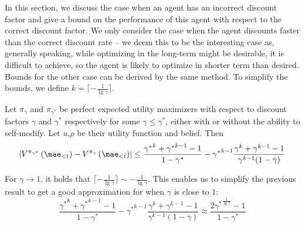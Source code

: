 In this section, we discuss the case when an agent has an incorrect discount factor and give a bound on the performance of this agent with respect to the correct discount factor. We only consider the case when the agent discounts faster than the correct discount rate -- we deem this to be the interesting case as, generally speaking, while optimizing in the long-term might be desirable, it is difficult to achieve, so the agent is likely to optimize in shorter term than desired. Bounds for the other case can be derived by the same method. To simplify the bounds, we define $k = \lceil - \frac{1}{\lg \gamma}\rceil$.

\begin{theorem}\label{thm:imprecise_discount}
Let $\pi_{\gamma}$ and $\pi_{\gamma^*}$ be perfect expected utility maximizers with respect to discount factors $\gamma$ and $\gamma^*$ respectively for some $\gamma \leq \gamma^*$, either with or without the ability to self-modify. Let $u$,$\rho$ be their utility function and belief. Then 
\[ %
\left|V^{\pi_{\gamma^*}}\left(\mae_{<t}\right)-V^{\pi_{\gamma}}\left(\mae_{<t}\right)\right| \leq \frac{{\gamma^*}^{k} + {\gamma^*}^{k-1} - 1}{1-\gamma^*} - {\gamma^*}^{k-1}\frac{\gamma^{k} + \gamma^{k-1} - 1}{\gamma^{k-1}(1-\gamma)}
\]
\end{theorem}

\smallskip \noindent
For $\gamma \rightarrow 1$, it holds that $\lceil - \frac{1}{\lg \gamma} \rceil \sim - \frac{1}{\lg \gamma}$. This enables us to simplify the previous result to get a good approximation for when $\gamma$ is close to $1$:
\[
\frac{{\gamma^*}^{k} + {\gamma^*}^{k-1} - 1}{1-\gamma^*} - {\gamma^*}^{k-1}\frac{\gamma^{k} + \gamma^{k-1} - 1}{\gamma^{k-1}(1-\gamma)} \approx \frac{2 {\gamma^*}^\frac{1}{\lg \gamma}-1}{1-\gamma^*}
\]
